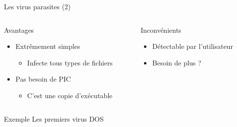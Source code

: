 \documentclass{beamer}
\begin{document}
\begin{frame}{Les virus parasites (2)}
\begin{columns}[t]
\begin{column}{4cm}
Avantages
\begin{itemize}
\item Extrêmement simples
\begin{itemize}
\item Infecte tous types de fichiers
\end{itemize}
\item Pas besoin de PIC
\begin{itemize}
\item C'est une copie d'exécutable
\end{itemize}
\end{itemize}
\end{column}
\begin{column}{5cm}
\item Inconvénients
\begin{itemize}
\item Détectable par l'utilisateur
\item Besoin de plus ?
\end{itemize}
\end{column}
\end{columns}
\begin{alertblock}{Exemple}
Les premiers virus DOS
\end{alertblock}
\end{frame}
\end{document}
